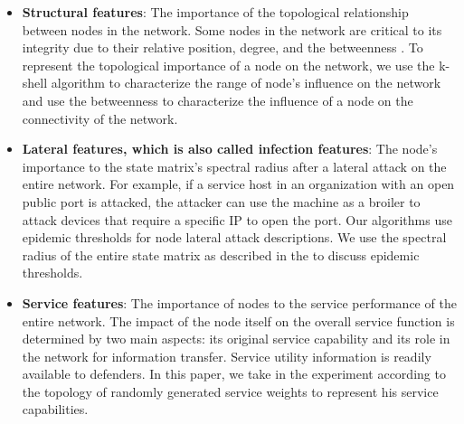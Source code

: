 \documentclass[lettersize,journal]{IEEEtran}
\begin{document}
 
 \begin{itemize}
        \item \textbf{Structural features}: The importance of the topological relationship between nodes in the network. Some nodes in the network are critical to its integrity due to their relative position, degree, and the betweenness \cite{freeman1977set}. To represent the topological importance of a node on the network, we use the k-shell \cite{maji2020influential} algorithm to characterize the range of node's influence on the network and use the betweenness to characterize the influence of a node on the connectivity of the network.
        \item \textbf{Lateral features, which is also called infection features}: The node's importance to the state matrix's spectral radius after a lateral attack on the entire network. For example, if a service host in an organization with an open public port is attacked, the attacker can use the machine as a broiler to attack devices that require a specific IP to open the port. Our algorithms use epidemic thresholds \cite{li2021dynamics} for node lateral attack descriptions. We use the spectral radius of the entire state matrix as described in the \cite{zino2021analysis} to discuss epidemic thresholds.
        \item \textbf{Service features}: The importance of nodes to the service performance of the entire network. The impact of the node itself on the overall service function is determined by two main aspects: its original service capability and its role in the network for information transfer. Service utility information is readily available to defenders. In this paper, we take in the experiment according to the topology of randomly generated service weights to represent his service capabilities.
    \end{itemize}
\par
\end{document}
